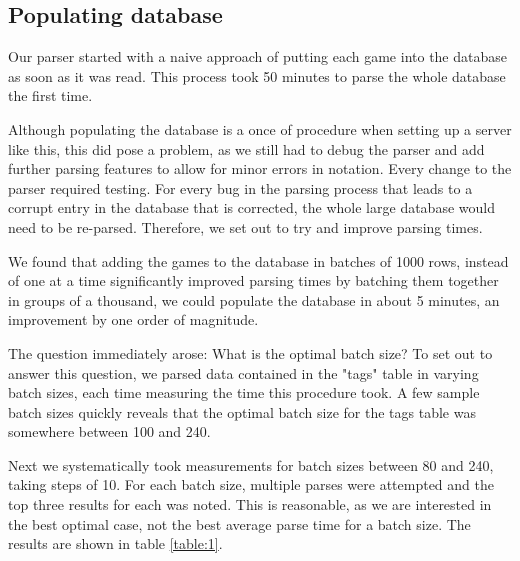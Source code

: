 \documentclass{article}
\begin{document}
\subsection{Populating database}
Our parser started with a naive approach of putting each game into the
database as soon as it was read.  This process took 50 minutes to parse the
whole database the first time.

Although populating the database is a once
of procedure when setting up a server like this, this did pose a problem,
as we still had to debug the parser and add further parsing features to
allow for minor errors in notation. Every change to the parser required
testing.  For every bug in the parsing process that leads to a corrupt
entry in the database that is corrected, the whole large database would
need to be re-parsed.  Therefore, we set out to try and improve parsing
times.

We found that adding the games to the database in batches of 1000 rows, instead
of one at a time significantly improved parsing times by batching them
together in groups of a thousand, we could populate the database in about 5
minutes, an improvement by one order of magnitude.

The question immediately arose:  What is the optimal batch size? To set out
to answer this question, we parsed data contained in the "tags" table in
varying batch sizes, each time measuring the time this procedure took.  A
few sample batch sizes quickly reveals that the optimal batch size for the
tags table was somewhere between 100 and 240.

Next we systematically took measurements for batch sizes between 80 and
240, taking steps of 10.  For each batch size, multiple parses were
attempted and the top three results for each was noted. This is reasonable,
as we are interested in the best optimal case, not the best average parse
time for a batch size.  The results are shown in table \ref{table:1}.
\end{document}
